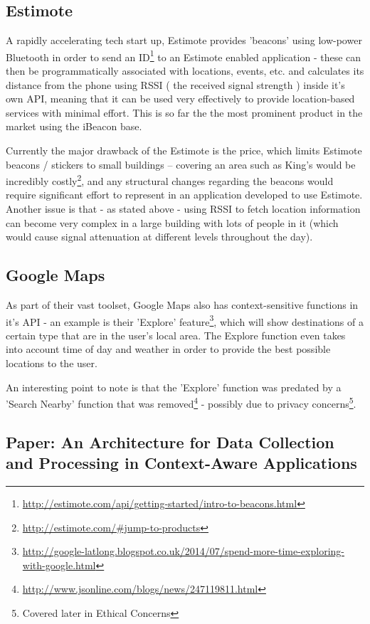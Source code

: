 \documentclass[11pt]{informatics-report}
\begin{document}
\subsection{Estimote}

A rapidly accelerating tech start up, Estimote provides 'beacons' using low-power Bluetooth in order to send an ID\footnote{\url{http://estimote.com/api/getting-started/intro-to-beacons.html}} to an Estimote enabled application - these can then be programmatically associated with locations, events, etc. and calculates its distance from the phone using RSSI ( the received signal strength ) inside it's own API, meaning that it can be used very effectively to provide location-based services with minimal effort. This is so far the the most prominent product in the market using the iBeacon base.

Currently the major drawback of the Estimote is the price, which limits Estimote beacons / stickers to small buildings – covering an area such as King’s would be incredibly costly\footnote{\url{http://estimote.com/#jump-to-products}}, and any structural changes regarding the beacons would require significant effort to represent in an application developed to use Estimote. Another issue is that - as stated above - using RSSI to fetch location information can become very complex in a large building with lots of people in it (which would cause signal attenuation at different levels throughout the day). 

\subsection{Google Maps}

As part of their vast toolset, Google Maps also has context-sensitive functions in it's API - an example is their 'Explore' feature\footnote{\url{http://google-latlong.blogspot.co.uk/2014/07/spend-more-time-exploring-with-google.html}}, which will show destinations of a certain type that are in the user's local area. The Explore function even takes into account time of day and weather in order to provide the best possible locations to the user.

An interesting point to note is that the 'Explore' function was predated by a 'Search Nearby' function that was removed\footnote{\url{http://www.jsonline.com/blogs/news/247119811.html}} - possibly due to privacy concerns\footnote{Covered later in Ethical Concerns}.


\subsection{Paper: An Architecture for Data Collection and Processing in Context-Aware Applications}\cite{salviarchitecture}
\end{document}

